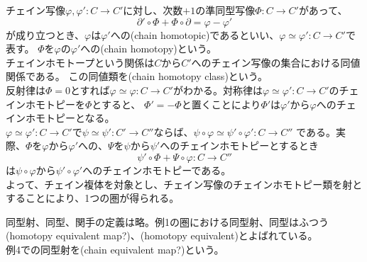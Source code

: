\documentclass[dvipdfmx,a4paper,11pt]{jsarticle}
\begin{document}
\begin{tcolorbox}[title = 例4]
  チェイン写像$\varphi,\varphi':C\to C'$に対し、次数$+1$の準同型写像$\Phi : C\to C'$があって、
  \begin{equation*}
    \partial' \circ \Phi + \Phi \circ \partial = \varphi - \varphi'
  \end{equation*}
  が成り立つとき、$\varphi$は$\varphi'$への(chain homotopic)であるといい、$\varphi \simeq \varphi' : C\to C'$で表す。
  $\Phi$を$\varphi$の$\varphi'$への(chain homotopy)という。\\
  チェインホモトープという関係は$C$から$C'$へのチェイン写像の集合における同値関係である。
  この同値類を(chain homotopy class)という。\\
  反射律は$\Phi=0$とすれば$\varphi \simeq \varphi : C\to C'$がわかる。対称律は$\varphi \simeq \varphi' : C\to C'$のチェインホモトピーを$\Phi$とすると、
  $\Phi'=-\Phi$と置くことにより$\Phi'$は$\varphi'$から$\varphi$へのチェインホモトピーとなる。\\
  $\varphi\simeq \varphi' : C\to C'$で$\psi \simeq \psi' :C' \to C''$ならば、$\psi \circ \varphi \simeq \psi' \circ \varphi' : C\to C''$
  である。実際、$\Phi$を$\varphi$から$\varphi'$への、$\Psi$を$\psi$から$\psi'$へのチェインホモトピーとするとき
  \begin{equation*}
    \psi'\circ \Phi + \Psi \circ \varphi : C\to C''
  \end{equation*}
  は$\psi \circ \varphi$から$\psi'\circ \varphi'$へのチェインホモトピーである。\\
  よって、チェイン複体を対象とし、チェイン写像のチェインホモトピー類を射とすることにより、1つの圏が得られる。
\end{tcolorbox}
同型射、同型、関手の定義は略。例1の圏における同型射、同型はふつう(homotopy equivalent map?)、(homotopy equivalent)とよばれている。\\
例4での同型射を(chain equivalent map?)という。
\end{document}
